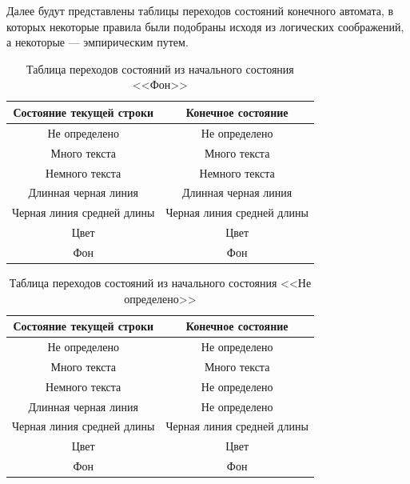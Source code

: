 Далее будут представлены таблицы переходов состояний конечного автомата, в которых некоторые правила были подобраны исходя из логических соображений, а некоторые --- эмпирическим путем.

\begin{table}[H]
    \centering
    \caption{Таблица переходов состояний из начального состояния <<Фон>>}
    \label{tab:background}
    \begin{tabular}{|c|c|}
        \hline
        \textbf{Состояние текущей строки} & \textbf{Конечное состояние} \\ \hline
        Не определено & Не определено \\ \hline
        Много текста & Много текста \\ \hline
        Немного текста & Немного текста \\ \hline
        Длинная черная линия & Длинная черная линия \\ \hline
        Черная линия средней длины & Черная линия средней длины \\ \hline
        Цвет & Цвет \\ \hline
        Фон & Фон \\ \hline
    \end{tabular}
\end{table}

\begin{table}[H]
    \centering
    \caption{Таблица переходов состояний из начального состояния <<Не определено>>}
    \label{tab:undefined}
    \begin{tabular}{|c|c|}
        \hline
        \textbf{Состояние текущей строки} & \textbf{Конечное состояние} \\ \hline
        Не определено & Не определено \\ \hline
        Много текста & Много текста \\ \hline
        Немного текста & Не определено \\ \hline
        Длинная черная линия & Не определено \\ \hline
        Черная линия средней длины & Черная линия средней длины \\ \hline
        Цвет & Цвет \\ \hline
        Фон & Фон \\ \hline
    \end{tabular}
\end{table}

